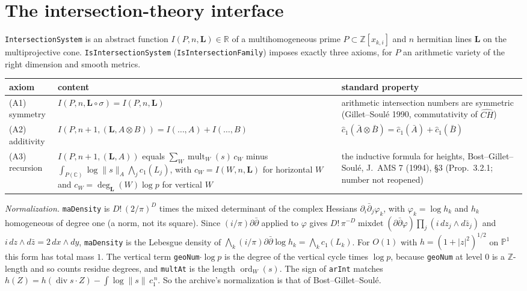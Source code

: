 \documentclass[11pt]{article}
\newcommand{\lean}[1]{\nolinkurl{#1}}
\theoremstyle{definition}
\begin{document}
\section{The intersection-theory interface}\label{sec:is}

\lean{IntersectionSystem} is an abstract function $I(P,n,\mathbf L)\in\mathbb R$ of a multihomogeneous prime $P\subset\mathbb Z[x_{k,i}]$ and $n$ hermitian lines $\mathbf L$ on the multiprojective cone. \lean{IsIntersectionSystem} (\lean{IsIntersectionFamily}) imposes exactly three axioms, for $P$ an arithmetic variety of the right dimension and smooth metrics.

\begin{longtable}{L{3.4cm}L{6.4cm}L{5.4cm}}
\toprule
axiom & content & standard property\\
\midrule
(A1) symmetry & $I(P,n,\mathbf L\circ\sigma)=I(P,n,\mathbf L)$ & arithmetic intersection numbers are symmetric (Gillet--Soulé 1990, commutativity of $\widehat{CH}$)\\
(A2) additivity & $I(P,n+1,(\mathbf L,A\otimes B))=I(\dots,A)+I(\dots,B)$ & $\hat c_1(\bar A\otimes\bar B)=\hat c_1(\bar A)+\hat c_1(\bar B)$\\
(A3) recursion & $I(P,n+1,(\mathbf L,A))$ equals $\sum_W\operatorname{mult}_W(s)\,c_W$ minus $\int_{P(\mathbb C)}\log\lVert s\rVert_A\bigwedge_jc_1(L_j)$, with $c_W=I(W,n,\mathbf L)$ for horizontal $W$ and $c_W=\deg_{\mathbf L}(W)\log p$ for vertical $W$ & the inductive formula for heights, Bost--Gillet--Soulé, J.\ AMS 7 (1994), §3 (Prop.~3.2.1; number not reopened)\\
\bottomrule
\end{longtable}

\emph{Normalization.} \lean{maDensity} is $D!\,(2/\pi)^D$ times the mixed determinant of the complex Hessians $\partial_i\bar\partial_j\varphi_k$, with $\varphi_k=\log h_k$ and $h_k$ homogeneous of degree one (a norm, not its square). Since $(i/\pi)\partial\bar\partial$ applied to $\varphi$ gives $D!\,\pi^{-D}\operatorname{mixdet}(\partial\bar\partial\varphi)\prod_j(i\,dz_j\wedge d\bar z_j)$ and $i\,dz\wedge d\bar z=2\,dx\wedge dy$, \lean{maDensity} is the Lebesgue density of $\bigwedge_k(i/\pi)\partial\bar\partial\log h_k=\bigwedge_kc_1(L_k)$. For $O(1)$ with $h=(1+\lvert z\rvert^2)^{1/2}$ on $\mathbb P^1$ this form has total mass $1$. The vertical term \lean{geoNum}$\cdot\log p$ is the degree of the vertical cycle times $\log p$, because \lean{geoNum} at level $0$ is a $\mathbb Z$-length and so counts residue degrees, and \lean{multAt} is the length $\operatorname{ord}_W(s)$. The sign of \lean{arInt} matches $h(Z)=h(\operatorname{div}s\cdot Z)-\int\log\lVert s\rVert\,c_1^{\,n}$. So the archive's normalization is that of Bost--Gillet--Soulé.
\end{document}

